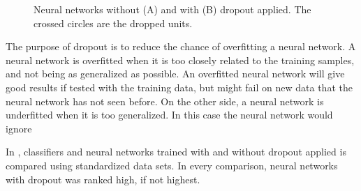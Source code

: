 \begin{figure}[H]
\begin{subfigure}{1\textwidth}
    \caption{}
    \label{fig:net_with_dropout}
    \end{subfigure}
\caption{Neural networks without (A) and with (B) dropout applied. The crossed circles are the dropped units.}
\label{fig:dropout_comparison}
\end{figure}

The purpose of dropout is to reduce the chance of overfitting a neural network. A neural network is overfitted when it is too closely related to the training samples, and not being as generalized as possible. An overfitted neural network will give good results if tested with the training data, but might fail on new data that the neural network has not seen before. On the other side, a neural network is underfitted when it is too generalized. In this case the neural network would ignore 

In \cite{srivastava_dropout:_2014}, classifiers and neural networks trained with and without dropout applied is compared using standardized data sets. In every comparison, neural networks with dropout was ranked high, if not highest.

